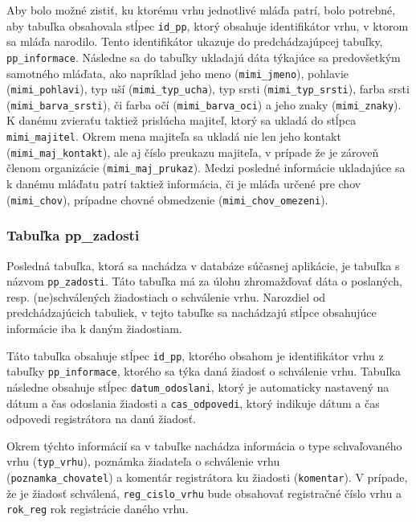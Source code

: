 Aby bolo možné zistiť, ku ktorému vrhu jednotlivé mláďa patrí, bolo potrebné, aby tabuľka obsahovala stĺpec \texttt{id_pp}, ktorý obsahuje identifikátor vrhu, v ktorom sa mláďa narodilo. Tento identifikátor ukazuje do predchádzajúpcej tabuľky,  \texttt{pp_informace}. Následne sa do tabuľky ukladajú dáta týkajúce sa predovšetkým samotného mláďata, ako napríklad jeho meno (\texttt{mimi_jmeno}), pohlavie (\texttt{mimi_pohlavi}), typ uší (\texttt{mimi_typ_ucha}), typ srsti (\texttt{mimi_typ_srsti}), farba srsti (\texttt{mimi_barva_srsti}), či farba očí (\texttt{mimi_barva_oci}) a jeho znaky (\texttt{mimi_znaky}). K danému zvieraťu taktiež prislúcha majiteľ, ktorý sa ukladá do stĺpca \texttt{mimi_majitel}. Okrem mena majiteľa sa ukladá nie len jeho kontakt (\texttt{mimi_maj_kontakt}), ale aj číslo preukazu majiteľa, v prípade že je zároveň členom organizácie (\texttt{mimi_maj_prukaz}). Medzi posledné informácie ukladajúce sa k danému mláďatu patrí taktiež informácia, či je mláďa určené pre chov (\texttt{mimi_chov}), prípadne chovné obmedzenie (\texttt{mimi_chov_omezeni}).

\subsubsection*{Tabuľka pp\_zadosti}

Posledná tabuľka, ktorá sa nachádza v databáze súčasnej aplikácie, je tabuľka s názvom \texttt{pp_zadosti}.
Táto tabuľka má za úlohu zhromažďovať dáta o poslaných, resp. (ne)schválených žiadostiach o schválenie vrhu. 
Narozdiel od predchádzajúcich tabuliek, v tejto tabuľke sa nachádzajú stĺpce obsahujúce informácie iba k daným žiadostiam.

Táto tabuľka obsahuje stĺpec \texttt{id_pp}, ktorého obsahom je identifikátor vrhu z tabuľky \texttt{pp_informace}, ktorého sa týka daná žiadosť o schválenie vrhu. Tabuľka následne obsahuje stĺpec \texttt{datum_odoslani}, ktorý je automaticky nastavený na dátum a čas odoslania žiadosti a \texttt{cas_odpovedi}, ktorý indikuje dátum a čas odpovedi registrátora na danú žiadosť.

Okrem týchto informácií sa v tabuľke nachádza informácia o type schvaľovaného vrhu (\texttt{typ_vrhu}), poznámka žiadateľa o schválenie vrhu \\ (\texttt{poznamka_chovatel}) a komentár registrátora ku žiadosti (\texttt{komentar}). V prípade, že je žiadosť schválená, \texttt{reg_cislo_vrhu} bude obsahovať registračné číslo vrhu a \texttt{rok_reg} rok registrácie daného vrhu.


